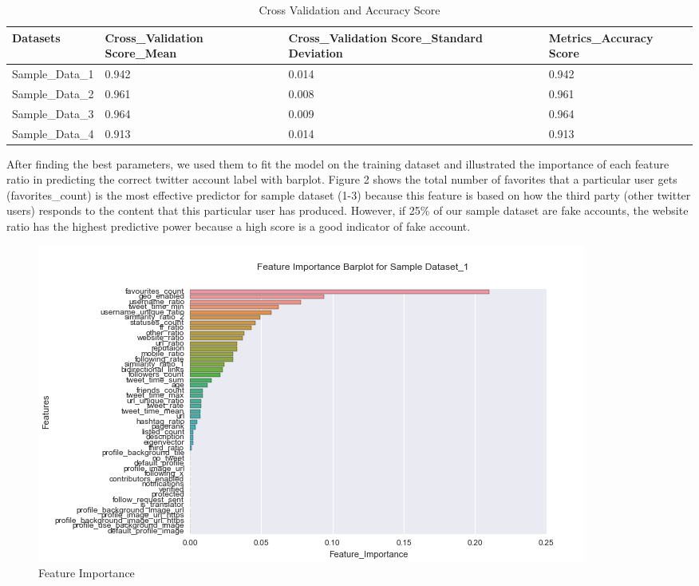 \documentclass[a4paper, 12pt]{report}
\begin{document}
\begin{table}[h!]
	\caption{Cross Validation and Accuracy Score}
	\centering
	\begin{tabular}{p{3cm} |p{3.5cm}|p{3.5cm}|p{3.5cm}}	
		\hline
		Datasets & Cross\_Validation
		Score\_Mean    & Cross\_Validation
		Score\_Standard Deviation
		& Metrics\_Accuracy
		Score\\
		\hline
		Sample\_Data\_1 & 0.942    &0.014 & 0.942\\
		\hline
		Sample\_Data\_2 & 0.961    &0.008 & 0.961\\
		\hline
		Sample\_Data\_3 & 0.964    &0.009 & 0.964\\
		\hline
		Sample\_Data\_4 & 0.913    &0.014 & 0.913\\
		\hline
	\end{tabular}
\end{table}

\noindent After finding the best parameters, we used them to fit the model on the training dataset and illustrated the importance of each feature ratio in predicting the correct twitter account label with barplot. Figure 2 shows the total number of favorites that a particular user gets (favorites\_count) is the most effective predictor for sample dataset (1-3) because this feature is based on how the third party (other twitter users) responds to the content that this particular user has produced. However, if 25\% of our sample dataset are fake accounts, the website ratio has the highest predictive power because a high score is a good indicator of fake account.  

\begin{figure}[h!]
	\centering
	\includegraphics[scale=0.7]{feature_1}
	\caption{Feature Importance}
\end{figure}
\end{document}
